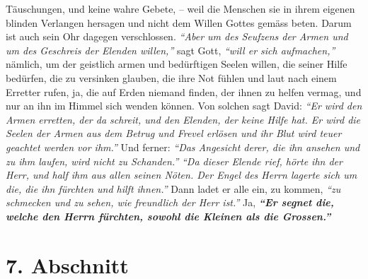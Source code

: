 Täuschungen, und keine wahre Gebete, -- weil die Menschen sie in ihrem eigenen
blinden Verlangen hersagen und nicht dem Willen Gottes
gemäss beten. Darum ist
auch sein Ohr dagegen verschlossen.
\textit{"`Aber um des Seufzens der Armen und um des Geschreis der Elenden
willen,"'}
sagt Gott,
\textit{"`will er sich aufmachen,"'}
nämlich, um der geistlich armen und bedürftigen
Seelen willen, die seiner Hilfe bedürfen, die zu versinken glauben, die ihre
Not fühlen und laut nach einem Erretter rufen, ja, die auf Erden niemand
finden, der ihnen zu helfen vermag, und nur an ihn im Himmel sich wenden
können. Von solchen sagt David:
\textit{"`Er wird den Armen erretten, der da schreit,
und den Elenden, der keine Hilfe hat. Er wird die Seelen der Armen aus dem
Betrug und Frevel erlösen und ihr Blut wird teuer geachtet werden vor
ihm."'}
Und ferner:
\textit{"`Das Angesicht derer, die ihn ansehen und zu ihm laufen, wird nicht zu
Schanden."'}
\textit{"`Da dieser Elende rief, hörte ihn der Herr, und half ihm aus allen
seinen Nöten. Der Engel des Herrn lagerte sich um die, die ihn fürchten und
hilft ihnen."'}
Dann ladet er alle ein, zu kommen,
\textit{"`zu schmecken und zu sehen, wie freundlich der Herr
ist."'}
Ja, \textbf{\textit{"`Er segnet die, welche den Herrn fürchten,
sowohl die Kleinen als
die Grossen."'}}

\section{7. Abschnitt} \label{kap6_ab7}

